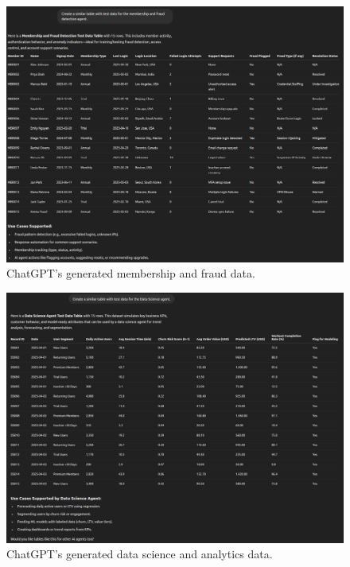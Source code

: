 \documentclass[11pt,letterpaper]{article}
\begin{document}
\begin{figure}[h!]
    \centering
      \includegraphics[width=1.0\linewidth]{chatgpt_09.png}    
      \caption{ChatGPT's generated membership and fraud data.}
    \label{fig:membership}
\end{figure}

\begin{figure}[h!]
    \centering
      \includegraphics[width=1.0\linewidth]{chatgpt_10.png}    
      \caption{ChatGPT's generated data science and analytics data.}
    \label{fig:ds}
\end{figure}
\end{document}
